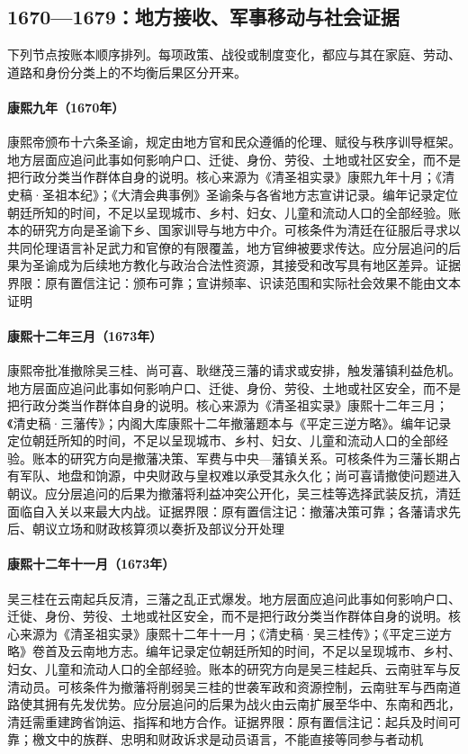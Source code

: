 \subsection{1670—1679：地方接收、军事移动与社会证据}
下列节点按账本顺序排列。每项政策、战役或制度变化，都应与其在家庭、劳动、道路和身份分类上的不均衡后果区分开来。
\hypertarget{social:EQ-1670-SACRED-EDICT}{}\paragraph{康熙九年（1670年）}康熙帝颁布十六条圣谕，规定由地方官和民众遵循的伦理、赋役与秩序训导框架。地方层面应追问此事如何影响户口、迁徙、身份、劳役、土地或社区安全，而不是把行政分类当作群体自身的说明。核心来源为《清圣祖实录》康熙九年十月；《清史稿·圣祖本纪》；《大清会典事例》圣谕条与各省地方志宣讲记录。编年记录定位朝廷所知的时间，不足以呈现城市、乡村、妇女、儿童和流动人口的全部经验。账本的研究方向是圣谕下乡、国家训导与地方中介。可核条件为清廷在征服后寻求以共同伦理语言补足武力和官僚的有限覆盖，地方官绅被要求传达。应分层追问的后果为圣谕成为后续地方教化与政治合法性资源，其接受和改写具有地区差异。证据界限：原有置信注记：颁布可靠；宣讲频率、识读范围和实际社会效果不能由文本证明
\hypertarget{social:EQ-1673-FEUDATORY-ABOLITION}{}\paragraph{康熙十二年三月（1673年）}康熙帝批准撤除吴三桂、尚可喜、耿继茂三藩的请求或安排，触发藩镇利益危机。地方层面应追问此事如何影响户口、迁徙、身份、劳役、土地或社区安全，而不是把行政分类当作群体自身的说明。核心来源为《清圣祖实录》康熙十二年三月；《清史稿·三藩传》；内阁大库康熙十二年撤藩题本与《平定三逆方略》。编年记录定位朝廷所知的时间，不足以呈现城市、乡村、妇女、儿童和流动人口的全部经验。账本的研究方向是撤藩决策、军费与中央—藩镇关系。可核条件为三藩长期占有军队、地盘和饷源，中央财政与皇权难以承受其永久化；尚可喜请撤使问题进入朝议。应分层追问的后果为撤藩将利益冲突公开化，吴三桂等选择武装反抗，清廷面临自入关以来最大内战。证据界限：原有置信注记：撤藩决策可靠；各藩请求先后、朝议立场和财政核算须以奏折及部议分开处理
\hypertarget{social:EQ-1673-WU-REVOLT}{}\paragraph{康熙十二年十一月（1673年）}吴三桂在云南起兵反清，三藩之乱正式爆发。地方层面应追问此事如何影响户口、迁徙、身份、劳役、土地或社区安全，而不是把行政分类当作群体自身的说明。核心来源为《清圣祖实录》康熙十二年十一月；《清史稿·吴三桂传》；《平定三逆方略》卷首及云南地方志。编年记录定位朝廷所知的时间，不足以呈现城市、乡村、妇女、儿童和流动人口的全部经验。账本的研究方向是吴三桂起兵、云南驻军与反清动员。可核条件为撤藩将削弱吴三桂的世袭军政和资源控制，云南驻军与西南道路使其拥有先发优势。应分层追问的后果为战火由云南扩展至华中、东南和西北，清廷需重建跨省饷运、指挥和地方合作。证据界限：原有置信注记：起兵及时间可靠；檄文中的族群、忠明和财政诉求是动员语言，不能直接等同参与者动机
